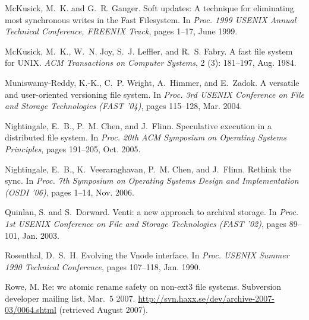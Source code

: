 \documentclass[9pt,twocolumn,letterpaper]{article}
\begin{document}
\begin{footnotesize}
\begin{thebibliography}{43}
McKusick, M.~K. and G.~R. Ganger.
\newblock Soft updates: A technique for eliminating most synchronous writes in
  the {F}ast {F}ilesystem.
\newblock In \emph{Proc. 1999 USENIX Annual Technical Conference, FREENIX
  Track}, pages 1--17, June 1999.

McKusick, M.~K., W.~N. Joy, S.~J. Leffler, and R.~S. Fabry.
\newblock A fast file system for {UNIX}.
\newblock \emph{{ACM} Transactions on Computer Systems}, 2
  (3): 181--197, Aug. 1984.

Muniswamy-Reddy, K.-K., C.~P. Wright, A.~Himmer, and E.~Zadok.
\newblock A versatile and user-oriented versioning file system.
\newblock In \emph{Proc. 3rd {USENIX} Conference on File and Storage
  Technologies ({FAST} '04)}, pages 115--128, Mar. 2004.

Nightingale, E.~B., P.~M. Chen, and J.~Flinn.
\newblock Speculative execution in a distributed file system.
\newblock In \emph{Proc. 20th {ACM} {S}ymposium on {O}perating {S}ystems
  {P}rinciples}, pages 191--205, Oct. 2005.

Nightingale, E.~B., K.~Veeraraghavan, P.~M. Chen, and J.~Flinn.
\newblock Rethink the sync.
\newblock In \emph{Proc. 7th Symposium on Operating Systems Design and
  Implementation ({OSDI} '06)}, pages 1--14, Nov. 2006.

Quinlan, S. and S.~Dorward.
\newblock Venti: a new approach to archival storage.
\newblock In \emph{Proc. 1st {USENIX} Conference on File and Storage
  Technologies ({FAST} '02)}, pages 89--101, Jan. 2003.

Rosenthal, D.~S.~H.
\newblock Evolving the {V}node interface.
\newblock In \emph{Proc. USENIX Summer 1990 Technical Conference}, pages
  107--118, Jan. 1990.

Rowe, M.
\newblock Re: wc atomic rename safety on non-ext3 file systems.
\newblock Subversion developer mailing list, Mar.~5 2007.
\newblock \url{http://svn.haxx.se/dev/archive-2007-03/0064.shtml} (retrieved
  August 2007).


\end{thebibliography}
\end{footnotesize}
\end{document}
